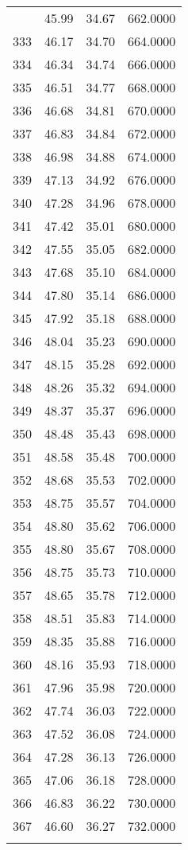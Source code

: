 \documentclass[
  captions=tableheading,
]{scrartcl}
\begin{document}
\begin{longtable} {l|l|l|l}
{332 &	45.99 &	34.67 &	662.0000\\
333 &	46.17 &	34.70 &	664.0000\\
334 &	46.34 &	34.74 &	666.0000\\
335 &	46.51 &	34.77 &	668.0000\\
336 &	46.68 &	34.81 &	670.0000\\
337 &	46.83 &	34.84 &	672.0000\\
338 &	46.98 &	34.88 &	674.0000\\
339 &	47.13 &	34.92 &	676.0000\\
340	 & 47.28 & 34.96 & 678.0000\\
341 &	47.42 &	35.01 &	680.0000\\
342 &	47.55 &	35.05 &	682.0000\\
343 &	47.68 &	35.10 &	684.0000\\
344 &	47.80 &	35.14 &	686.0000\\
345 &	47.92 &	35.18 &	688.0000\\
346 &	48.04 &	35.23 &	690.0000\\
347 &	48.15 &	35.28 &	692.0000\\
348 &	48.26 &	35.32 &	694.0000\\
349 &	48.37 &	35.37 &	696.0000\\
350 &	48.48 &	35.43 &	698.0000\\
351 &	48.58 &	35.48 &	700.0000\\
352 &	48.68 &	35.53 &	702.0000\\
353 &	48.75 &	35.57 &	704.0000\\
354 &	48.80 &	35.62 &	706.0000\\
355 &	48.80 &	35.67 &	708.0000\\
356 &	48.75 &	35.73 &	710.0000\\
357 &	48.65 &	35.78 &	712.0000\\
358 &	48.51 &	35.83 &	714.0000\\
359 &	48.35 &	35.88 &	716.0000\\
360 &	48.16 &	35.93 &	718.0000\\
361 &	47.96 &	35.98 &	720.0000\\
362 &	47.74 &	36.03 &	722.0000\\
363 &	47.52 &	36.08 &	724.0000\\
364 &	47.28 &	36.13 &	726.0000\\
365 &	47.06 &	36.18 &	728.0000\\
366 &	46.83 &	36.22 &	730.0000\\
367 &	46.60 &	36.27 &	732.0000\\
}
\end{longtable}
\end{document}
